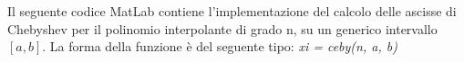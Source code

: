 Il seguente codice MatLab contiene l'implementazione del calcolo delle ascisse di Chebyshev per il polinomio interpolante di grado n, su un generico intervallo $[a,b]$. La forma della funzione è del seguente tipo: \textit{xi = ceby(n, a, b)}\\\
